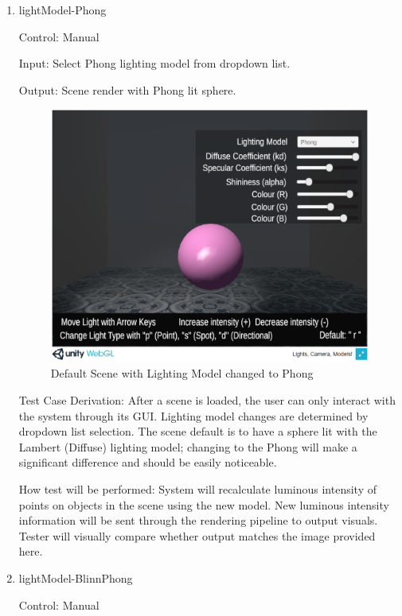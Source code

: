 \documentclass[12pt, titlepage]{article}
\begin{document}
\begin{enumerate}
	\item{lightModel-Phong\\}
	
	Control: Manual
	
	Input: Select Phong lighting model from dropdown list. 
	
	Output: Scene render with Phong lit sphere.
	
	\begin{figure}[h]
		\centering
		\includegraphics[scale=0.25]{./images/sphere-lit-phong}
		\caption{Default Scene with Lighting Model changed to Phong}
		\label{fig:Phong}
	\end{figure}
	
	Test Case Derivation: After a scene is loaded, the user can only interact 
	with the system through its GUI. Lighting model changes are determined by 
	dropdown list selection. The scene default is to have a sphere lit with the 
	Lambert (Diffuse) lighting model; changing to the Phong will make a 
	significant difference and should be easily noticeable.
	
	How test will be performed: System will recalculate luminous intensity of 
	points on objects in the scene using the new model. New luminous intensity 
	information will be sent through the rendering pipeline to output        
	visuals. Tester will visually compare whether output matches the image 
	provided here.
	
	\item{lightModel-BlinnPhong\\}
	
	Control: Manual
	

\end{enumerate}
\end{document}
